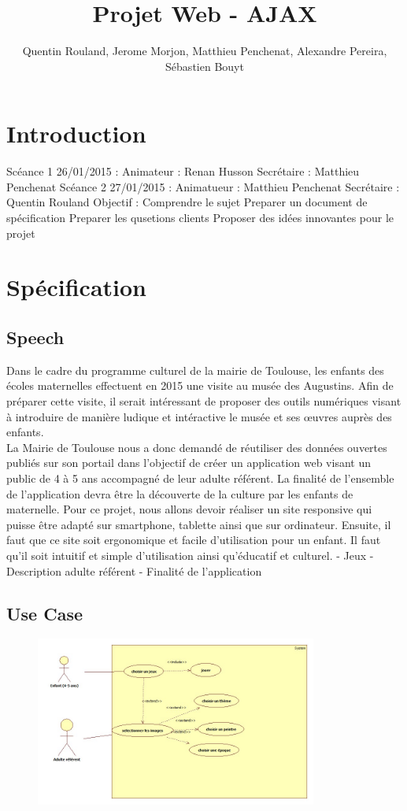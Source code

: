 \documentclass[12pt,a4paper]{report}
\author{Quentin Rouland, Jerome Morjon, Matthieu Penchenat, Alexandre Pereira, Sébastien Bouyt}
\affil{Université Toulouse, Jean Jaurès - L3 MIASHS - Document D1 : Specification Fonctionnelle}
\begin{document}
\title{Projet Web - AJAX}
\maketitle
\renewcommand{\contentsname}{Sommaire}
\tableofcontents
\chapter*{Introduction}
Scéance 1 26/01/2015 :
Animateur : Renan Husson
Secrétaire : Matthieu Penchenat
Scéance 2 27/01/2015 :
Animatueur : Matthieu Penchenat
Secrétaire : Quentin Rouland
Objectif :
Comprendre le sujet
Preparer un document de spécification
Preparer les qusetions clients
Proposer des idées innovantes pour le projet
\chapter{Spécification}
\section{Speech}
Dans le cadre du programme culturel de la mairie de Toulouse, les enfants des écoles maternelles effectuent en 2015 une visite au musée des Augustins. Afin de préparer cette visite, il serait intéressant de proposer des outils numériques visant à introduire de manière ludique et intéractive le musée et ses œuvres auprès des enfants.\\
La Mairie de Toulouse nous a donc demandé de réutiliser des données ouvertes publiés sur son portail dans l'objectif de créer un application web visant un public de 4 à 5 ans accompagné de leur adulte référent. La finalité de l'ensemble de l'application devra être la découverte de la culture par les enfants de maternelle.
Pour ce projet, nous allons devoir réaliser un site responsive qui puisse être adapté sur smartphone, tablette ainsi que sur ordinateur. Ensuite, il faut que ce site soit ergonomique et facile d'utilisation pour un enfant. Il faut qu'il soit intuitif et simple d'utilisation ainsi qu'éducatif et culturel.
- Jeux
- Description adulte référent
- Finalité de l'application
\section{Use Case}
\begin{figure}[!h]
\centering
\includegraphics[width=350px]{uml.jpg}
\end{figure}
\end{document}
